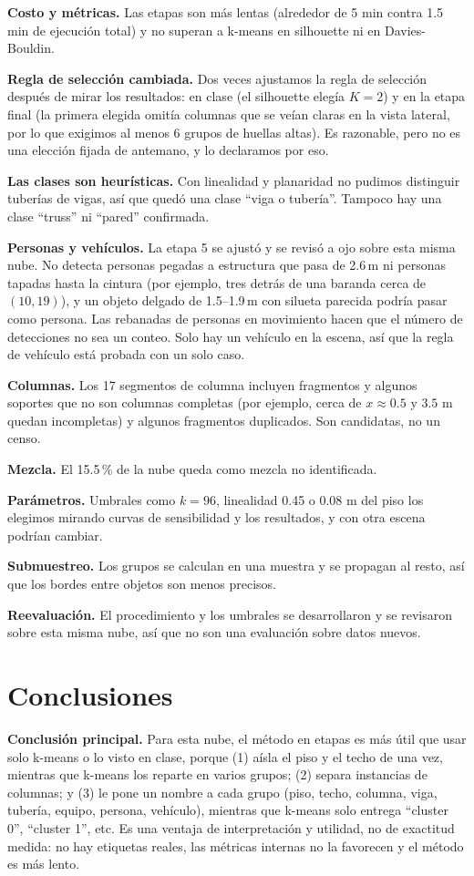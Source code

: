 \documentclass[10pt,a4paper]{article}
\begin{document}
\textbf{Costo y métricas.} Las etapas son más lentas (alrededor de 5 min contra 1.5 min
de ejecución total) y no superan a k-means en silhouette ni en Davies-Bouldin.

\textbf{Regla de selección cambiada.} Dos veces ajustamos la regla de selección después
de mirar los resultados: en clase (el silhouette elegía $K=2$) y en la etapa final (la
primera elegida omitía columnas que se veían claras en la vista lateral, por lo que exigimos
al menos 6 grupos de huellas altas). Es razonable, pero no es una elección fijada de
antemano, y lo declaramos por eso.

\textbf{Las clases son heurísticas.} Con linealidad y planaridad no pudimos distinguir
tuberías de vigas, así que quedó una clase ``viga o tubería''. Tampoco hay una clase
``truss'' ni ``pared'' confirmada.

\textbf{Personas y vehículos.} La etapa 5 se ajustó y se revisó a ojo sobre esta
misma nube. No detecta personas pegadas a estructura que pasa de 2.6\,m ni personas tapadas
hasta la cintura (por ejemplo, tres detrás de una baranda cerca de $(10, 19)$), y un objeto
delgado de 1.5--1.9\,m con silueta parecida podría pasar como persona. Las rebanadas de
personas en movimiento hacen que el número de detecciones no sea un conteo. Solo hay un
vehículo en la escena, así que la regla de vehículo está probada con un solo caso.

\textbf{Columnas.} Los 17 segmentos de columna incluyen fragmentos y algunos soportes
que no son columnas completas (por ejemplo, cerca de $x\approx0.5$ y $3.5$ m quedan
incompletas) y algunos fragmentos duplicados. Son candidatas, no un censo.

\textbf{Mezcla.} El 15.5\,\% de la nube queda como mezcla no identificada.

\textbf{Parámetros.} Umbrales como $k=96$, linealidad 0.45 o 0.08 m del piso los
elegimos mirando curvas de sensibilidad y los resultados, y con otra escena podrían cambiar.

\textbf{Submuestreo.} Los grupos se calculan en una muestra y se propagan al resto,
así que los bordes entre objetos son menos precisos.

\textbf{Reevaluación.} El procedimiento y los umbrales se desarrollaron y se
revisaron sobre esta misma nube, así que no son una evaluación sobre datos nuevos.

\section{Conclusiones}
\textbf{Conclusión principal.} Para esta nube, el método en etapas es más útil que usar solo
k-means o lo visto en clase, porque (1) aísla el piso y el techo de una vez, mientras que
k-means los reparte en varios grupos; (2) separa instancias de columnas; y (3) le pone un nombre
a cada grupo (piso, techo, columna, viga, tubería, equipo, persona, vehículo), mientras que k-means solo
entrega ``cluster 0'', ``cluster 1'', etc. Es una ventaja de interpretación y utilidad, no de
exactitud medida: no hay etiquetas reales, las métricas internas no la favorecen y el método
es más lento.
\end{document}
